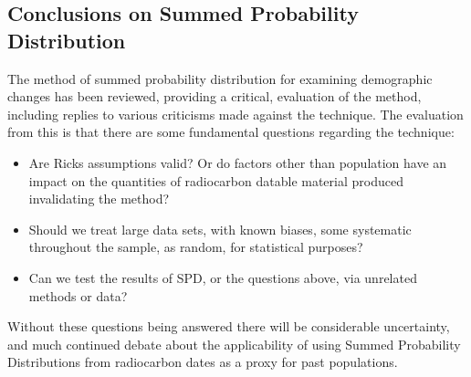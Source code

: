 \subsection{Conclusions on Summed Probability Distribution}
The method of summed probability distribution for examining demographic changes has been reviewed, providing a critical, evaluation of the method, including replies to various criticisms made against the technique. The evaluation from this is that there are some fundamental questions regarding the technique:
\begin{itemize}
\item Are Ricks assumptions valid? Or do factors other than population have an impact on the quantities of radiocarbon datable material produced invalidating the method? 
\item Should we treat large data sets, with known biases, some systematic throughout the sample, as random, for statistical purposes?
\item Can we test the results of SPD, or the questions above, via unrelated methods or data?
\end{itemize}

Without these questions being answered there will be considerable uncertainty, and much continued debate about the applicability of using Summed Probability Distributions from radiocarbon dates as a proxy for past populations.

